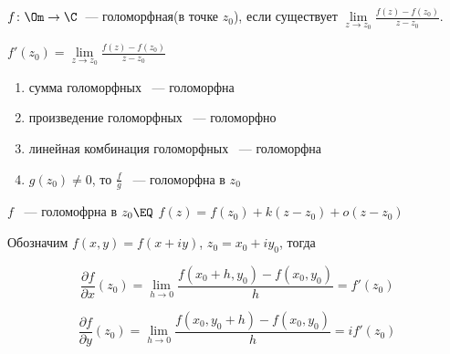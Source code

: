 \begin{definition}
    $f\colon\Om\to\C$~--- голоморфная(в точке $z_0$),
    если существует
    $\lim\limits_{z\to z_0} \frac{f(z) - f(z_0)}{z-z_0}$.
\end{definition}
\begin{designation}
    $f'(z_0) = \lim\limits_{z\to z_0} \frac{f(z) - f(z_0)}{z-z_0}$
\end{designation}

\begin{properties}
    \begin{enumerate}
        \item сумма голоморфных ~--- голоморфна
        \item произведение голоморфных ~--- голоморфно
        \item линейная комбинация голоморфных ~--- голоморфна
        \item $g(z_0) \neq 0$, то $\frac{f}{g}$ ~--- голоморфна в $z_0$
    \end{enumerate}
\end{properties}

\begin{observation} $f$ ~--- голомофрна в $z_0 \EQ$
    $f(z) = f(z_0) +k(z - z_0) + o(z-z_0)$
\end{observation}

\begin{observation}
    Обозначим $f(x, y) = f(x + iy)$,
    $z_0 = x_0 + iy_0$,
    тогда

    \[
        \frac{\partial f}{\partial x}(z_0)
        = \lim_{h \to 0} \frac{f(x_0+h, y_0) - f(x_0, y_0)}{h}
        = f'(z_0)
    \]

    \[
        \frac{\partial f}{\partial y}(z_0)
        = \lim_{h \to 0} \frac{f(x_0, y_0+h) - f(x_0, y_0)}{h}
        = if'(z_0)
    \]
\end{observation}


